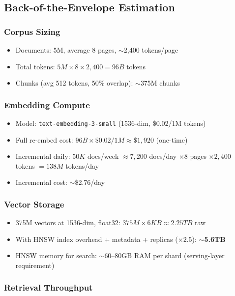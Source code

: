 \subsection*{Back-of-the-Envelope Estimation}

\subsubsection*{Corpus Sizing}

\begin{itemize}
  \item Documents: 5M, average 8 pages, $\sim$2,400 tokens/page
  \item Total tokens: $5M \times 8 \times 2{,}400 = 96B$ tokens
  \item Chunks (avg 512 tokens, 50\% overlap): $\sim$375M chunks
\end{itemize}

\subsubsection*{Embedding Compute}

\begin{itemize}
  \item Model: \texttt{text-embedding-3-small} (1536-dim, \$0.02/1M tokens)
  \item Full re-embed cost: $96B \times \$0.02/1M \approx \$1{,}920$ (one-time)
  \item Incremental daily: $50K$ docs/week $\approx 7{,}200$ docs/day $\times 8$ pages $\times 2{,}400$ tokens $= 138M$ tokens/day
  \item Incremental cost: $\sim$\$2.76/day
\end{itemize}

\subsubsection*{Vector Storage}

\begin{itemize}
  \item 375M vectors at 1536-dim, float32: $375M \times 6KB \approx 2.25TB$ raw
  \item With HNSW index overhead + metadata + replicas ($\times 2.5$): \textbf{$\sim$5.6TB}
  \item HNSW memory for search: $\sim$60--80GB RAM per shard (serving-layer requirement)
\end{itemize}

\subsubsection*{Retrieval Throughput}


